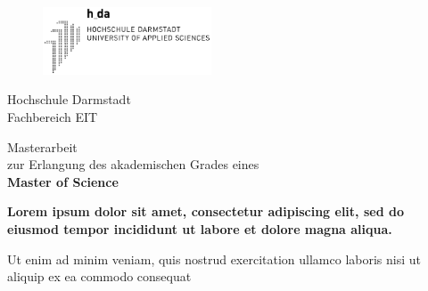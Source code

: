 \begin{titlepage}
  \thispagestyle{empty}
  
    \begin{center}
  
        \begin{figure}[t]
            \centering
            \includegraphics[width=5cm]{resources/img/logo_hda.png}
        \end{figure}
  
        \vspace{0.5cm}

        \begin{large}
          Hochschule Darmstadt\\
          Fachbereich EIT
  
          \vspace{0.5cm}
  
          Masterarbeit\\
          zur Erlangung des akademischen Grades eines\\
          \vspace{0.2cm}
          \textbf{Master of Science}
        \end{large}
  
        \vspace{0.75cm}
  
        \begin{large}
          \textbf{Lorem ipsum dolor sit amet, consectetur adipiscing elit, sed do eiusmod tempor incididunt ut labore et dolore magna aliqua.}\\
        \end{large}
  
        \vspace{0.25cm}
  
        \begin{large}
          Ut enim ad minim veniam, quis nostrud exercitation ullamco laboris nisi ut aliquip ex ea commodo consequat\\
        \end{large}
  
        \vspace{0.75cm}
  

\end{center}
\end{titlepage}
